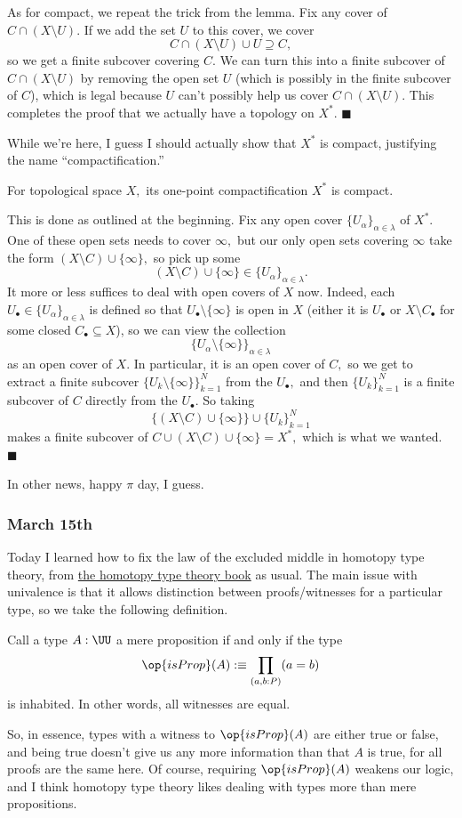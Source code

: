 As for compact, we repeat the trick from the lemma. Fix any cover of $C\cap(X\setminus U).$ If we add the set $U$ to this cover, we cover
\[C\cap(X\setminus U)\cup U\supseteq C,\]
so we get a finite subcover covering $C.$ We can turn this into a finite subcover of $C\cap(X\setminus U)$ by removing the open set $U$ (which is possibly in the finite subcover of $C$), which is legal because $U$ can't possibly help us cover $C\cap(X\setminus U).$ This completes the proof that we actually have a topology on $X^*.$ $\blacksquare$

While we're here, I guess I should actually show that $X^*$ is compact, justifying the name ``compactification.''
\begin{proposition}
    For topological space $X,$ its one-point compactification $X^*$ is compact.
\end{proposition}
This is done as outlined at the beginning. Fix any open cover $\{U_\alpha\}_{\alpha\in\lambda}$ of $X^*.$ One of these open sets needs to cover $\infty,$ but our only open sets covering $\infty$ take the form $(X\setminus C)\cup\{\infty\},$ so pick up some
\[(X\setminus C)\cup\{\infty\}\in\{U_\alpha\}_{\alpha\in\lambda}.\]
It more or less suffices to deal with open covers of $X$ now. Indeed, each $U_\bullet\in\{U_\alpha\}_{\alpha\in\lambda}$ is defined so that $U_\bullet\setminus\{\infty\}$ is open in $X$ (either it is $U_\bullet$ or $X\setminus C_\bullet$ for some closed $C_\bullet\subseteq X$), so we can view the collection
\[\{U_\alpha\setminus\{\infty\}\}_{\alpha\in\lambda}\]
as an open cover of $X.$ In particular, it is an open cover of $C,$ so we get to extract a finite subcover $\{U_k\setminus\{\infty\}\}_{k=1}^N$ from the $U_\bullet,$ and then $\{U_k\}_{k=1}^N$ is a finite subcover of $C$ directly from the $U_\bullet.$ So taking
\[\{(X\setminus C)\cup\{\infty\}\}\cup\{U_k\}_{k=1}^N\]
makes a finite subcover of $C\cup(X\setminus C)\cup\{\infty\}=X^*,$ which is what we wanted. $\blacksquare$

In other news, happy $\pi$ day, I guess.

\subsubsection{March 15th}
Today I learned how to fix the law of the excluded middle in homotopy type theory, from \href{https://homotopytypetheory.org/book/}{the homotopy type theory book} as usual. The main issue with univalence is that it allows distinction between proofs/witnesses for a particular type, so we take the following definition.
\begin{definition}
    Call a type $A:\UU$ a mere proposition if and only if the type
    \[\op{isProp}(A):\equiv\prod_{(a,b:P)}(a=b)\]
    is inhabited. In other words, all witnesses are equal.
\end{definition}
So, in essence, types with a witness to $\op{isProp}(A)$ are either true or false, and being true doesn't give us any more information than that $A$ is true, for all proofs are the same here. Of course, requiring $\op{isProp}(A)$ weakens our logic, and I think homotopy type theory likes dealing with types more than mere propositions.

